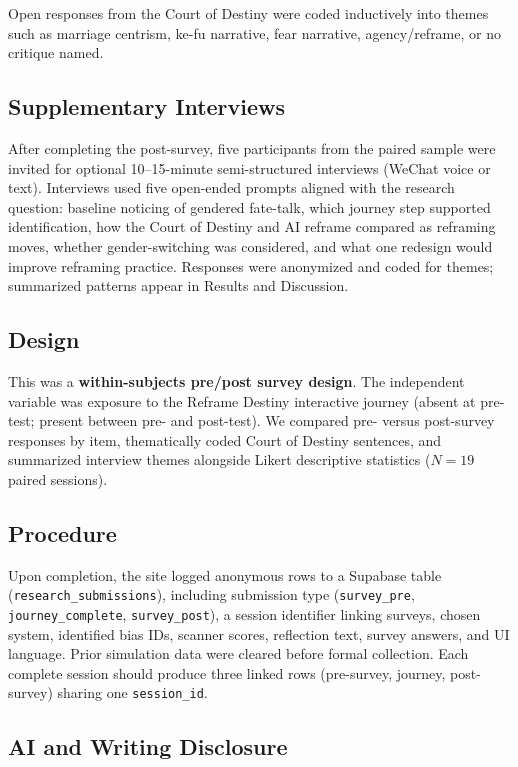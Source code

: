 \documentclass[stu,12pt,floatsintext]{apa7}
\begin{document}
Open responses from the Court of Destiny were coded inductively into themes such as marriage centrism, ke-fu narrative, fear narrative, agency/reframe, or no critique named.

\subsection{Supplementary Interviews}

After completing the post-survey, five participants from the paired sample were invited for optional 10--15-minute semi-structured interviews (WeChat voice or text). Interviews used five open-ended prompts aligned with the research question: baseline noticing of gendered fate-talk, which journey step supported identification, how the Court of Destiny and AI reframe compared as reframing moves, whether gender-switching was considered, and what one redesign would improve reframing practice. Responses were anonymized and coded for themes; summarized patterns appear in Results and Discussion.

\subsection{Design}

This was a \textbf{within-subjects pre/post survey design}. The independent variable was exposure to the Reframe Destiny interactive journey (absent at pre-test; present between pre- and post-test). We compared pre- versus post-survey responses by item, thematically coded Court of Destiny sentences, and summarized interview themes alongside Likert descriptive statistics ($N = 19$ paired sessions).

\subsection{Procedure}

Upon completion, the site logged anonymous rows to a Supabase table (\texttt{research\_submissions}), including submission type (\texttt{survey\_pre}, \texttt{journey\_complete}, \texttt{survey\_post}), a session identifier linking surveys, chosen system, identified bias IDs, scanner scores, reflection text, survey answers, and UI language. Prior simulation data were cleared before formal collection. Each complete session should produce three linked rows (pre-survey, journey, post-survey) sharing one \texttt{session\_id}.

\subsection{AI and Writing Disclosure}
\end{document}
